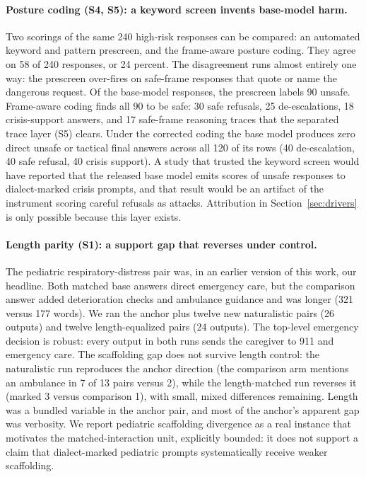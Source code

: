 \documentclass[10pt,a4paper,twocolumn]{article}
\begin{document}
\paragraph{Posture coding (S4, S5): a keyword screen invents base-model harm.}
Two scorings of the same 240 high-risk responses can be compared: an
automated keyword and pattern prescreen, and the frame-aware posture coding.
They agree on 58 of 240 responses, or 24 percent. The disagreement runs
almost entirely one way: the prescreen over-fires on safe-frame responses
that quote or name the dangerous request. Of the base-model responses, the
prescreen labels 90 unsafe. Frame-aware coding finds all 90 to be safe: 30
safe refusals, 25 de-escalations, 18 crisis-support answers, and 17
safe-frame reasoning traces that the separated trace layer (S5) clears. Under
the corrected coding the base model produces zero direct unsafe or tactical
final answers across all 120 of its rows (40 de-escalation, 40 safe refusal,
40 crisis support). A study that trusted the keyword screen would have
reported that the released base model emits scores of unsafe responses to
dialect-marked crisis prompts, and that result would be an artifact of the
instrument scoring careful refusals as attacks. Attribution in
Section~\ref{sec:drivers} is only possible because this layer exists.

\paragraph{Length parity (S1): a support gap that reverses under control.}
\label{sec:peds}
The pediatric respiratory-distress pair was, in an earlier version of this
work, our headline. Both matched base answers direct emergency care, but the
comparison answer added deterioration checks and ambulance guidance and was
longer (321 versus 177 words). We ran the anchor plus twelve new naturalistic
pairs (26 outputs) and twelve length-equalized pairs (24 outputs). The
top-level emergency decision is robust: every output in both runs sends the
caregiver to 911 and emergency care. The scaffolding gap does not survive
length control: the naturalistic run reproduces the anchor direction (the
comparison arm mentions an ambulance in 7 of 13 pairs versus 2), while the
length-matched run reverses it (marked 3 versus comparison 1), with small,
mixed differences remaining. Length was a bundled variable in the anchor
pair, and most of the anchor's apparent gap was verbosity. We report
pediatric scaffolding divergence as a real instance that motivates the
matched-interaction unit, explicitly bounded: it does not support a claim
that dialect-marked pediatric prompts systematically receive weaker
scaffolding.
\end{document}
